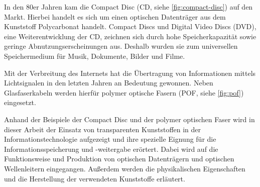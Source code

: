 In den 80er Jahren kam die Compact Disc (CD, siehe \autoref{fig:compact-disc})
auf den Markt. Hierbei handelt es sich um einen optischen Datenträger aus dem
Kunststoff Polycarbonat handelt. Compact Discs und Digital Video Discs (DVD),
eine Weiterentwicklung der CD, zeichnen sich durch hohe Speicherkapazität sowie
geringe Abnutzungserscheinungen aus. Deshalb wurden sie zum universellen
Speichermedium für Musik, Dokumente, Bilder und Filme.

Mit der Verbreitung des Internets hat die Übertragung von Informationen mittels
Lichtsignalen in den letzten Jahren an Bedeutung gewonnen. Neben Glasfaserkabeln
werden hierfür polymer optische Fasern (POF, siehe \autoref{fig:pof})
eingesetzt.

Anhand der Beispiele der Compact Disc und der polymer optischen Faser wird in
dieser Arbeit der Einsatz von transparenten Kunststoffen in der
Informationstechnologie aufgezeigt und ihre spezielle Eignung für die
Informationsspeicherung und -weitergabe erörtert. Dabei wird auf die
Funktionsweise und Produktion von optischen Datenträgern und optischen
Wellenleitern eingegangen. Außerdem werden die physikalischen Eigenschaften und
die Herstellung der verwendeten Kunststoffe erläutert.

